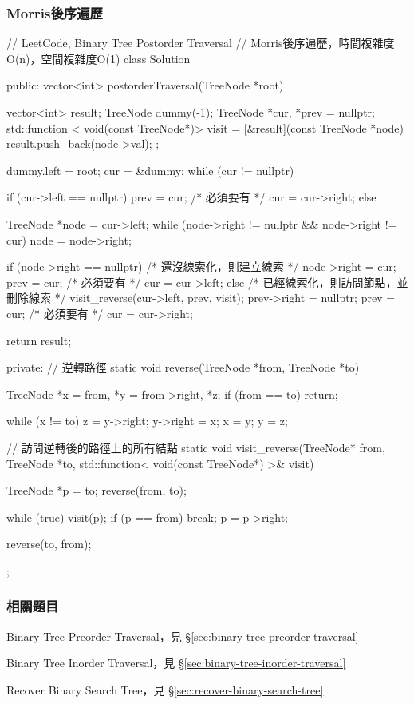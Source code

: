 \subsubsection{Morris後序遍歷}
\begin{Code}
// LeetCode, Binary Tree Postorder Traversal
// Morris後序遍歷，時間複雜度O(n)，空間複雜度O(1)
class Solution {
public:
    vector<int> postorderTraversal(TreeNode *root) {
        vector<int> result;
        TreeNode dummy(-1);
        TreeNode *cur, *prev = nullptr;
        std::function < void(const TreeNode*)> visit = 
            [&result](const TreeNode *node){
            result.push_back(node->val); 
        };

        dummy.left = root;
        cur = &dummy;
        while (cur != nullptr) {
            if (cur->left == nullptr) {
                prev = cur; /* 必須要有 */
                cur = cur->right;
            } else {
                TreeNode *node = cur->left;
                while (node->right != nullptr && node->right != cur)
                    node = node->right;

                if (node->right == nullptr) { /* 還沒線索化，則建立線索 */
                    node->right = cur;
                    prev = cur; /* 必須要有 */
                    cur = cur->left;
                } else { /* 已經線索化，則訪問節點，並刪除線索  */
                    visit_reverse(cur->left, prev, visit);
                    prev->right = nullptr;
                    prev = cur; /* 必須要有 */
                    cur = cur->right;
                }
            }
        }
        return result;
    }
private:
    // 逆轉路徑
    static void reverse(TreeNode *from, TreeNode *to) {
        TreeNode *x = from, *y = from->right, *z;
        if (from == to) return;

        while (x != to) {
            z = y->right;
            y->right = x;
            x = y;
            y = z;
        }
    }

    // 訪問逆轉後的路徑上的所有結點
    static void visit_reverse(TreeNode* from, TreeNode *to, 
                     std::function< void(const TreeNode*) >& visit) {
        TreeNode *p = to;
        reverse(from, to);

        while (true) {
            visit(p);
            if (p == from)
                break;
            p = p->right;
        }

        reverse(to, from);
    }
};
\end{Code}


\subsubsection{相關題目}
\begindot
\item Binary Tree Preorder Traversal，見 \S \ref{sec:binary-tree-preorder-traversal}
\item Binary Tree Inorder Traversal，見 \S \ref{sec:binary-tree-inorder-traversal}
\item Recover Binary Search Tree，見 \S \ref{sec:recover-binary-search-tree}
\myenddot


